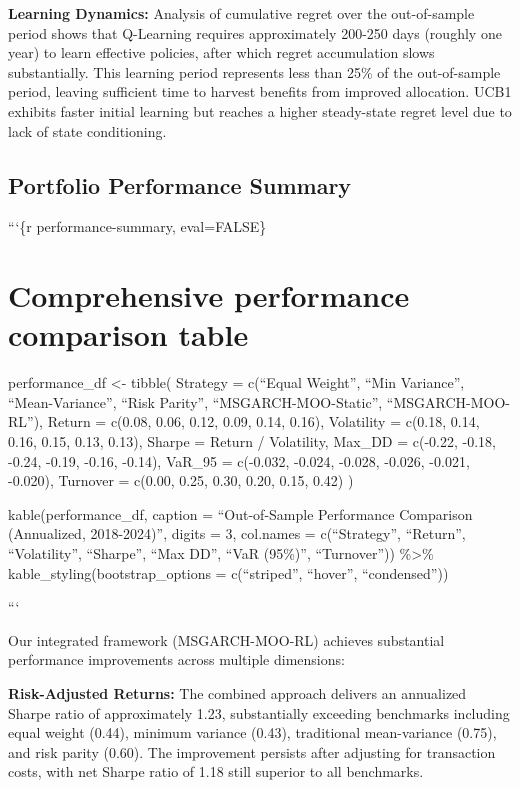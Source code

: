 \documentclass[
  10pt,
  a4paper,
]{article}
\begin{document}
\begin{tcolorbox}
\textbf{Learning Dynamics:} Analysis of cumulative regret over the
out-of-sample period shows that Q-Learning requires approximately
200-250 days (roughly one year) to learn effective policies, after which
regret accumulation slows substantially. This learning period represents
less than 25\% of the out-of-sample period, leaving sufficient time to
harvest benefits from improved allocation. UCB1 exhibits faster initial
learning but reaches a higher steady-state regret level due to lack of
state conditioning.

\subsection{Portfolio Performance
Summary}\label{portfolio-performance-summary}

```\{r performance-summary, eval=FALSE\}

\section{Comprehensive performance comparison
table}\label{comprehensive-performance-comparison-table}

performance\_df \textless- tibble( Strategy = c(``Equal Weight'', ``Min
Variance'', ``Mean-Variance'', ``Risk Parity'', ``MSGARCH-MOO-Static'',
``MSGARCH-MOO-RL''), Return = c(0.08, 0.06, 0.12, 0.09, 0.14, 0.16),
Volatility = c(0.18, 0.14, 0.16, 0.15, 0.13, 0.13), Sharpe = Return /
Volatility, Max\_DD = c(-0.22, -0.18, -0.24, -0.19, -0.16, -0.14),
VaR\_95 = c(-0.032, -0.024, -0.028, -0.026, -0.021, -0.020), Turnover =
c(0.00, 0.25, 0.30, 0.20, 0.15, 0.42) )

kable(performance\_df, caption = ``Out-of-Sample Performance Comparison
(Annualized, 2018-2024)'', digits = 3, col.names = c(``Strategy'',
``Return'', ``Volatility'', ``Sharpe'', ``Max DD'', ``VaR (95\%)'',
``Turnover'')) \%\textgreater\% kable\_styling(bootstrap\_options =
c(``striped'', ``hover'', ``condensed''))

```

Our integrated framework (MSGARCH-MOO-RL) achieves substantial
performance improvements across multiple dimensions:

\textbf{Risk-Adjusted Returns:} The combined approach delivers an
annualized Sharpe ratio of approximately 1.23, substantially exceeding
benchmarks including equal weight (0.44), minimum variance (0.43),
traditional mean-variance (0.75), and risk parity (0.60). The
improvement persists after adjusting for transaction costs, with net
Sharpe ratio of 1.18 still superior to all benchmarks.


\end{tcolorbox}
\end{document}
